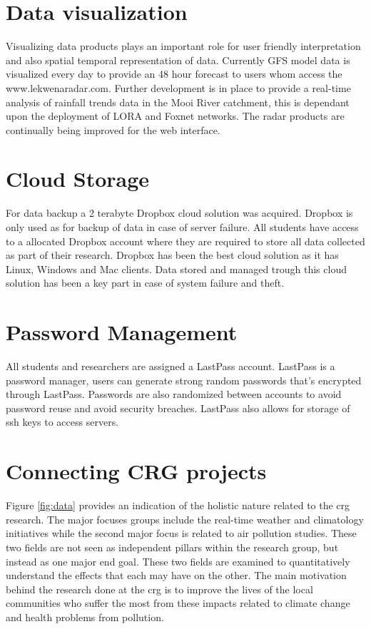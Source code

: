 \documentclass{wrcreport}
\begin{document}
\section{Data visualization}
Visualizing data products plays an important role for user friendly interpretation
and also spatial temporal representation of data. Currently GFS model data is
visualized every day to provide an 48 hour forecast to users whom access the
www.lekwenaradar.com. Further development is in place to provide a real-time
analysis of rainfall trends data in the Mooi River catchment, this is dependant upon
the deployment of LORA and Foxnet networks. The
radar products are continually being improved for the web interface.

\section{Cloud Storage}
For data backup a 2 terabyte Dropbox cloud solution was acquired.
Dropbox is only used as for backup of data in case of server failure.
All students have access to a allocated Dropbox account where they are
required to store all data collected as part of their research.
Dropbox has been the best cloud solution as it has Linux, Windows and
Mac clients. Data stored and managed trough this cloud solution has
been a key part in case of system failure and theft.

\section{Password Management}
All students and researchers are assigned a LastPass account. LastPass
is a password manager, users can generate strong random passwords
that's encrypted through LastPass. Passwords are also randomized
between accounts to avoid password reuse and avoid security breaches.
LastPass also allows for storage of ssh keys to access servers.

\section{Connecting CRG projects}
Figure \ref{fig:data} provides an indication of the holistic nature
related to the \gls{crg} research.  The major focuses groups include
the real-time weather and climatology initiatives while the second
major focus is related to air pollution studies. These two fields are
not seen as independent pillars within the research group, but instead
as one major end goal. These two fields are examined to quantitatively
understand the effects that each may have on the other.  The main
motivation behind the research done at the \gls{crg} is to improve the
lives of the local communities who suffer the most from these impacts
related to climate change and health problems from pollution.
\end{document}
